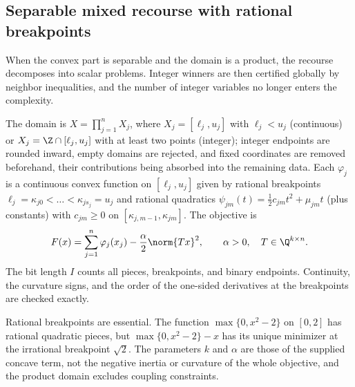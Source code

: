 \subsection{Separable mixed recourse with rational breakpoints}\label{sec:qp:separable}

When the convex part is separable and the domain is a product, the recourse
decomposes into scalar problems. Integer winners are then certified globally
by neighbor inequalities, and the number of integer variables no longer
enters the complexity.

\begin{definition}\label{def:qp:sep}
The domain is $X=\prod_{j=1}^nX_j$, where $X_j=[\ell_j,u_j]$ with
$\ell_j<u_j$ (continuous) or $X_j=\Z\cap[\ell_j,u_j]$ with at least two
points (integer); integer endpoints are rounded inward, empty domains are
rejected, and fixed coordinates are removed beforehand, their contributions
being absorbed into the remaining data. Each $\varphi_j$ is a continuous
convex function on $[\ell_j,u_j]$ given by rational breakpoints
$\ell_j=\kappa_{j0}<\dots<\kappa_{js_j}=u_j$ and rational quadratics
$\psi_{jm}(t)=\frac12c_{jm}t^2+\mu_{jm}t$ (plus constants) with
$c_{jm}\ge0$ on $[\kappa_{j,m-1},\kappa_{jm}]$. The objective is
\[
 F(x)=\sum_{j=1}^n\varphi_j(x_j)-\frac\alpha2\norm{Tx}^2,
 \qquad\alpha>0,\quad T\in\Q^{k\times n}.
\]
The bit length $I$ counts all pieces, breakpoints, and binary endpoints.
Continuity, the curvature signs, and the order of the one-sided derivatives at
the breakpoints are checked exactly.
\end{definition}

Rational breakpoints are essential. The function $\max\{0,x^2-2\}$ on $[0,2]$
has rational quadratic pieces, but $\max\{0,x^2-2\}-x$ has its unique minimizer
at the irrational breakpoint $\sqrt2$. The parameters $k$ and $\alpha$ are
those of the supplied concave term, not the negative inertia or curvature of
the whole objective, and the product domain excludes coupling constraints.

